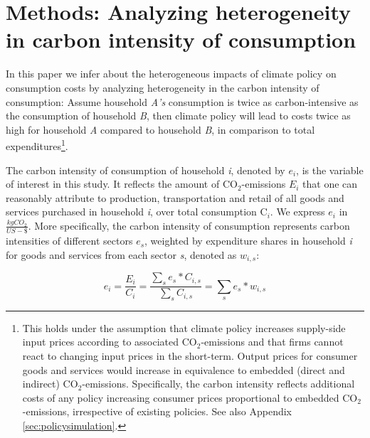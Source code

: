 \documentclass[12pt, a4paper]{article}
\begin{document}

\section{Methods: Analyzing heterogeneity in carbon intensity of consumption} \label{sec:methods}


In this paper we infer about the heterogeneous impacts of climate policy on consumption costs by analyzing heterogeneity in the carbon intensity of consumption: Assume household \textit{A's} consumption is twice as carbon-intensive as the consumption of household \textit{B}, then climate policy will lead to costs twice as high for household \textit{A} compared to household \textit{B}, in comparison to total expenditures\footnote{This holds under the assumption that climate policy increases supply-side input prices according to associated CO$_{2}$-emissions and that firms cannot react to changing input prices in the short-term. Output prices for consumer goods and services would increase in equivalence to embedded (direct and indirect) CO$_{2}$-emissions. Specifically, the carbon intensity reflects additional costs of any policy increasing consumer prices proportional to embedded CO$_{2}$-emissions, irrespective of existing policies. See also Appendix \ref{sec:policysimulation}.}.

The carbon intensity of consumption of household \textit{i}, denoted by $e_{i}$, is the variable of interest in this study. It reflects the amount of CO$_{2}$-emissions $E_{i}$ that one can reasonably attribute to production, transportation and retail of all goods and services purchased in household \textit{i}, over total consumption C$_{i}$. We express $e_{i}$ in $\frac{kgCO_{2}}{US-\$}$. More specifically, the carbon intensity of consumption represents carbon intensities of different sectors $e_{s}$, weighted by expenditure shares in household \textit{i} for goods and services from each sector \textit{s}, denoted as $w_{i,s}$:


\begin{equation} \label{eq:ei}
e_{i} = \frac{E_{i}}{C_{i}} = \frac{\sum_{s} e_{s}*C_{i,s}}{\sum_{s} C_{i,s}} = \sum_{s} e_{s}*w_{i,s}
\end{equation}
\end{document}
